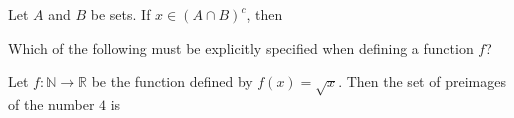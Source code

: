 \documentclass[addpoints]{exam}
\begin{document}
\begin{questions}
\question[2] Let $A$ and $B$ be sets. If $x \in (A \cap B)^c$, then 

\question[2] Which of the following must be explicitly specified when defining a function $f$? 

\question[2] Let $f: \mathbb{N} \rightarrow \mathbb{R}$ be the function defined by $f(x) = \sqrt{x}$. Then the set of preimages of the number $4$ is 
	\begin{parts}
		\part $\emptyset$

\end{parts}
\end{questions}
\end{document}
